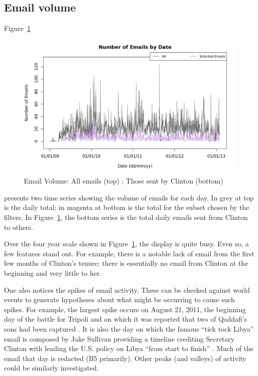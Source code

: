\documentclass[journal]{vgtc}                %
\begin{document}
\subsection{Email volume}
\label{sect:Displays:volume}
Figure~\ref{fig:VolumeAll} 
\begin{figure}[h]
\begin{center}
\includegraphics[width=0.95\linewidth]{VolumeFullTime}
\caption{Email Volume: All emails (top) ; Those sent by Clinton (bottom)}
\label{fig:VolumeAll}
\end{center}
\end{figure}
presents two time series showing the volume of emails for each day.  In grey at top is the daily total; in magenta at bottom is the total for the subset chosen by the filters.  In Figure~\ref{fig:VolumeAll}, the bottom series is the total daily emails sent from Clinton to others.

Over the four year scale shown in Figure~\ref{fig:VolumeAll}, the display is quite busy.  Even so, a few features stand out.  For example, there is a notable lack of email from the first few months of Clinton's tenure;  there is essentially no email from Clinton at the beginning and very little to her.   

One also notices the spikes of email activity.  These can be checked against world events to generate hypotheses about what might be occurring to cause such spikes.  For example, the largest spike occurs on August 21, 2011, the beginning day of the battle for Tripoli and on which it was reported that two of Qaddafi's sons had been captured \cite{battleTripoli}.  It is also the day on which the famous ``tick tock Libya'' email is composed by Jake Sullivan providing a timeline crediting Secretary Clinton with leading the U.S.  policy on Libya ``from start to finish'' \cite{tickTockLibya}.  Much of the email that day is redacted (B5 primarily).   Other peaks (and valleys) of activity could be similarly investigated.
\end{document}
